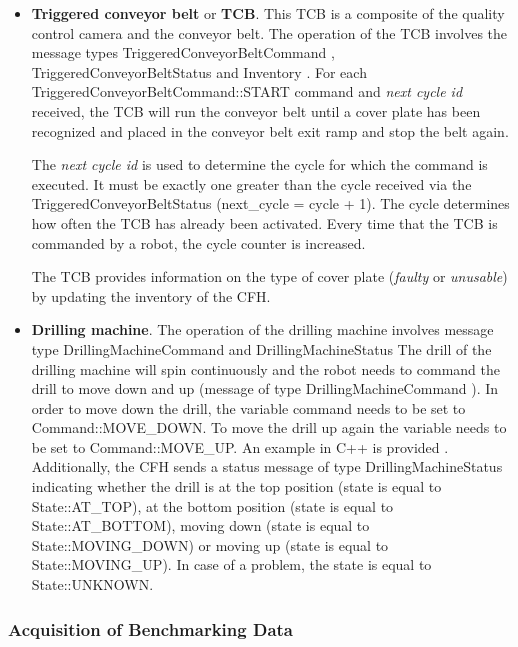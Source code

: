 \begin{itemize}
	\item \textbf{Triggered conveyor belt} or \textbf{TCB}. This TCB is a composite of the quality control camera and the conveyor belt. The operation of the TCB involves the message types TriggeredConveyorBeltCommand \cite{rockin:CFHMessages}, TriggeredConveyorBeltStatus \cite{rockin:CFHMessages} and Inventory \cite{rockin:CFHMessages}.
For each TriggeredConveyorBeltCommand::START command and \emph{next cycle id} received, the TCB will run the conveyor belt until a cover plate has been recognized and placed in the conveyor belt exit ramp and stop the belt again. 

The \emph{next cycle id} is used to determine the cycle for which the command is executed. It must be exactly one greater than the cycle received via the TriggeredConveyorBeltStatus (next\_cycle = cycle + 1). The cycle determines how often the TCB has already been activated. Every time that the TCB is commanded by a robot, the cycle counter is increased.

The TCB provides information on the type of cover plate (\emph{faulty} or \emph{unusable}) by updating the inventory of the CFH.
	\item \textbf{Drilling machine}. The operation of the drilling machine involves message type DrillingMachineCommand \cite{rockin:CFHMessages} and DrillingMachineStatus \cite{rockin:CFHMessages}
	The drill of the drilling machine will spin continuously and the robot needs to command the drill to move down and up (message of type DrillingMachineCommand \cite{rockin:CFHMessages}). 
	In order to move down the drill, the variable command needs to be set to Command::MOVE\_DOWN. 
	To move the drill up again the variable needs to be set to Command::MOVE\_UP.
	An example in C++ is provided \cite{rockin:CFHExamples}. 
	Additionally, the CFH sends a status message of type DrillingMachineStatus \cite{rockin:CFHMessages} indicating whether the drill is at the top position (state is equal to State::AT\_TOP), at the bottom position (state is equal to State::AT\_BOTTOM), moving down (state is equal to State::MOVING\_DOWN) or moving up (state is equal to State::MOVING\_UP). In case of a problem, the state is equal to State::UNKNOWN.
\end{itemize}

\subsubsection{Acquisition of Benchmarking Data}
\label{sssec:TaskPlateDrillingData}

